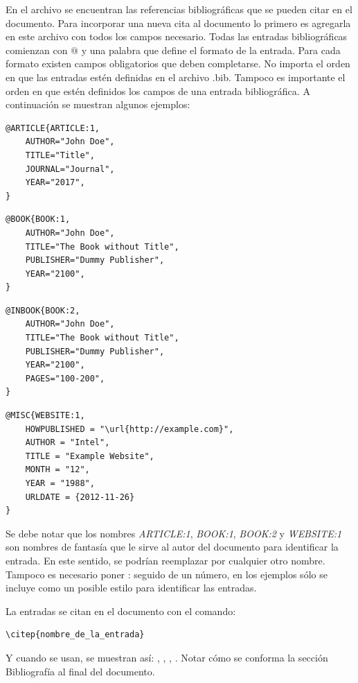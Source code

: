 En el archivo  se encuentran las referencias bibliográficas que se pueden citar en el documento.  Para incorporar una nueva cita al documento lo primero es agregarla en este archivo con todos los campos necesario.  Todas las entradas bibliográficas comienzan con $@$ y una palabra que define el formato de la entrada.  Para cada formato existen campos obligatorios que deben completarse. No importa el orden en que las entradas estén definidas en el archivo .bib.  Tampoco es importante el orden en que estén definidos los campos de una entrada bibliográfica. A continuación se muestran algunos ejemplos:

\begin{lstlisting}
@ARTICLE{ARTICLE:1,
    AUTHOR="John Doe",
    TITLE="Title",
    JOURNAL="Journal",
    YEAR="2017",
}
\end{lstlisting}


\begin{lstlisting}
@BOOK{BOOK:1,
    AUTHOR="John Doe",
    TITLE="The Book without Title",
    PUBLISHER="Dummy Publisher",
    YEAR="2100",
}
\end{lstlisting}


\begin{lstlisting}
@INBOOK{BOOK:2,
    AUTHOR="John Doe",
    TITLE="The Book without Title",
    PUBLISHER="Dummy Publisher",
    YEAR="2100",
    PAGES="100-200",
}
\end{lstlisting}


\begin{lstlisting}
@MISC{WEBSITE:1,
    HOWPUBLISHED = "\url{http://example.com}",
    AUTHOR = "Intel",
    TITLE = "Example Website",
    MONTH = "12",
    YEAR = "1988",
    URLDATE = {2012-11-26}
}
\end{lstlisting}

Se debe notar que los nombres \emph{ARTICLE:1}, \emph{BOOK:1}, \emph{BOOK:2} y \emph{WEBSITE:1} son nombres de fantasía que le sirve al autor del documento para identificar la entrada. En este sentido, se podrían reemplazar por cualquier otro nombre.  Tampoco es necesario poner : seguido de un número, en los ejemplos sólo se incluye como un posible estilo para identificar las entradas.

La entradas se citan en el documento con el comando: 

\begin{verbatim}
\citep{nombre_de_la_entrada}
\end{verbatim}

Y cuando se usan, se muestran así: \citep{ARTICLE:1}, \citep{BOOK:1}, \citep{BOOK:2}, \citep{WEBSITE:1}.  Notar cómo se conforma la sección Bibliografía al final del documento. 
